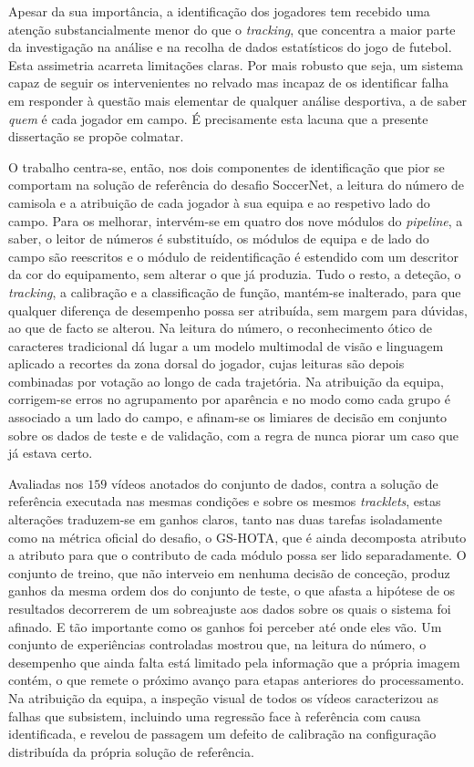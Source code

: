 Apesar da sua importância, a identificação dos jogadores tem recebido uma atenção substancialmente
menor do que o \emph{tracking}, que concentra a maior parte da investigação na análise e na recolha
de dados estatísticos do jogo de futebol. Esta assimetria acarreta limitações claras. Por mais
robusto que seja, um sistema capaz de seguir os intervenientes no relvado mas incapaz de os
identificar falha em responder à questão mais elementar de qualquer análise desportiva, a de saber
\emph{quem} é cada jogador em campo. É precisamente esta lacuna que a presente dissertação se propõe
colmatar.

O trabalho centra-se, então, nos dois componentes de identificação que pior se comportam na
solução de referência do desafio SoccerNet, a leitura do número de camisola e a atribuição de cada
jogador à sua equipa e ao respetivo lado do campo. Para os melhorar, intervém-se em quatro dos nove
módulos do \emph{pipeline}, a saber, o leitor de números é substituído, os módulos de equipa e de lado do
campo são reescritos e o módulo de reidentificação é estendido com um descritor da cor do
equipamento, sem alterar o que já produzia. Tudo o resto, a deteção, o \emph{tracking}, a
calibração e a classificação de função, mantém-se inalterado, para que qualquer diferença de
desempenho possa ser atribuída, sem margem para dúvidas, ao que de facto se alterou. Na leitura do
número, o reconhecimento ótico de caracteres tradicional dá lugar a um modelo multimodal de visão e
linguagem aplicado a recortes da zona dorsal do jogador, cujas leituras são depois combinadas por
votação ao longo de cada trajetória. Na atribuição da equipa, corrigem-se erros no agrupamento por
aparência e no modo como cada grupo é associado a um lado do campo, e afinam-se os limiares de
decisão em conjunto sobre os dados de teste e de validação, com a regra de nunca piorar um caso que
já estava certo.

Avaliadas nos $159$ vídeos anotados do conjunto de dados, contra a solução de referência executada
nas mesmas condições e sobre os mesmos \emph{tracklets}, estas alterações traduzem-se em ganhos
claros, tanto nas duas tarefas isoladamente como na métrica oficial do desafio, o GS-HOTA, que é
ainda decomposta atributo a atributo para que o contributo de cada módulo possa ser lido
separadamente. O conjunto de treino, que não interveio em nenhuma decisão de conceção, produz
ganhos da mesma ordem dos do conjunto de teste, o que afasta a hipótese de os resultados decorrerem
de um sobreajuste aos dados sobre os quais o sistema foi afinado. E tão importante como os ganhos
foi perceber até onde eles vão. Um conjunto de experiências controladas mostrou que, na leitura do
número, o desempenho que ainda falta está limitado pela informação que a própria imagem contém, o
que remete o próximo avanço para etapas anteriores do processamento. Na atribuição da equipa, a
inspeção visual de todos os vídeos caracterizou as falhas que subsistem, incluindo uma regressão
face à referência com causa identificada, e revelou de passagem um defeito de calibração na
configuração distribuída da própria solução de referência.

